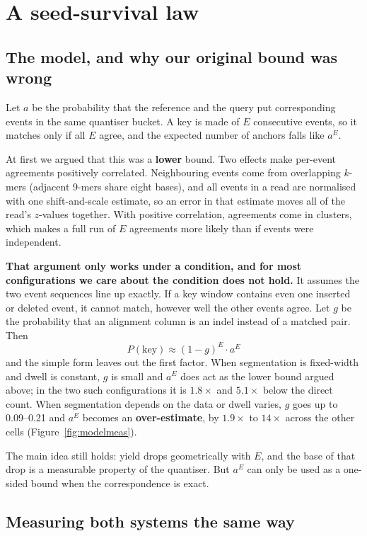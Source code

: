 \documentclass[conference]{IEEEtran}
\begin{document}
\section{A seed-survival law}
\label{sec:law}

\subsection{The model, and why our original bound was wrong}

Let $a$ be the probability that the reference and the query put corresponding events in the
same quantiser bucket. A key is made of $E$ consecutive events, so it matches only if all $E$
agree, and the expected number of anchors falls like $a^{E}$.

At first we argued that this was a \textbf{lower} bound. Two effects make per-event agreements
positively correlated. Neighbouring events come from overlapping $k$-mers (adjacent 9-mers share
eight bases), and all events in a read are normalised with one shift-and-scale estimate, so an
error in that estimate moves all of the read's $z$-values together. With positive correlation,
agreements come in clusters, which makes a full run of $E$ agreements more likely than if events
were independent.

\textbf{That argument only works under a condition, and for most configurations we care about
the condition does not hold.} It assumes the two event sequences line up exactly. If a key
window contains even one inserted or deleted event, it cannot match, however well the other
events agree. Let $g$ be the probability that an alignment column is an indel instead of a
matched pair. Then
\[ P(\mathrm{key}) \approx (1-g)^{E} \cdot a^{E} \]
and the simple form leaves out the first factor. When segmentation is fixed-width and dwell is
constant, $g$ is small and $a^{E}$ does act as the lower bound argued above; in the two such
configurations it is $1.8\times$ and $5.1\times$ below the direct count. When segmentation
depends on the data or dwell varies, $g$ goes up to 0.09--0.21 and $a^{E}$ becomes an
\textbf{over-estimate}, by $1.9\times$ to $14\times$ across the other cells
(Figure~\ref{fig:modelmeas}).

The main idea still holds: yield drops geometrically with $E$, and the base of that drop is a
measurable property of the quantiser. But $a^{E}$ can only be used as a one-sided bound when the
correspondence is exact.

\subsection{Measuring both systems the same way}
\end{document}

